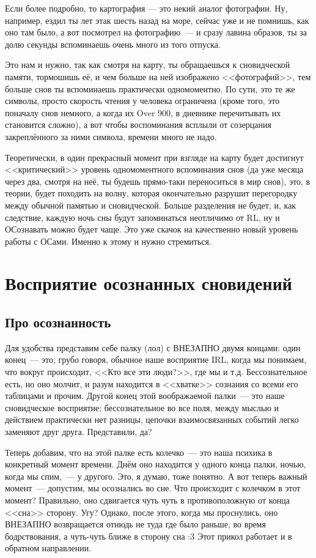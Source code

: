 \documentclass[a4paper,14pt,oneside]{memoir}
\begin{document}
Если более подробно, то картография — это некий аналог фотографии. Ну, например, ездил ты лет этак шесть назад на море, сейчас уже и не помнишь, как оно там было, а вот посмотрел на фотографию~--- и сразу лавина образов, ты за долю секунды вспоминаешь очень много из того отпуска.
 
Это нам и нужно, так как смотря на карту, ты обращаешься к сновидческой памяти, тормошишь её, и чем больше на ней изображено <<фотографий>>, тем больше снов ты вспоминаешь практически одномоментно. По сути, это те же символы, просто скорость чтения у человека ограничена (кроме того, это поначалу снов немного, а когда их Over 900, в дневнике перечитывать их становится сложно), а вот чтобы воспоминания всплыли от созерцания закреплённого за ними символа, времени много не надо. 

Теоретически, в один прекрасный момент при взгляде на карту будет достигнут <<критический>> уровень одномоментного вспоминания снов  (да уже месяца через два, смотря на неё, ты будешь прямо-таки переноситься в мир снов), это, в теории, будет походить на волну, которая окончательно разрушит перегородку между обычной памятью и сновидческой. Больше разделения не будет, и, как следствие, каждую ночь сны будут запоминаться неотличимо от RL, ну и ОСознавать можно будет чаще. Это уже скачок на качественно новый уровень работы с ОСами. Именно к этому и нужно стремиться. 



\chapter{Восприятие осознанных сновидений}


\section{Про осознанность}
Для удобства представим себе палку (лол) с ВНЕЗАПНО двумя концами: один конец~--- это, грубо говоря, обычное наше восприятие IRL, когда мы понимаем, что вокруг происходит, <<Кто все эти люди?>>, где мы и т.д. Бессознательное есть, но оно молчит, и разум находится в <<хватке>> сознания со всеми его таблицами и прочим. Другой конец этой воображаемой палки~--- это наше сновидческое восприятие; бессознательное во все поля, между мыслью и действием практически нет разницы, цепочки взаимосвязанных событий легко заменяют друг друга. Представили, да?
 
Теперь добавим, что на этой палке есть колечко~--- это наша психика в конкретный момент времени. Днём оно находится у одного конца палки, ночью, когда мы спим,~--- у другого. Это, я думаю, тоже понятно. А вот теперь важный момент~--- допустим, мы осознались во сне. Что происходит с колечком в этот момент? Правильно, оно сдвигается чуть чуть в противоположную от конца <<сна>> сторону. Угу? Однако, после этого, когда мы проснулись, оно ВНЕЗАПНО возвращается отнюдь не туда где было раньше, во время бодрствования, а чуть-чуть ближе в сторону сна :3 Этот прикол работает и в обратном направлении.
 
\end{document}
